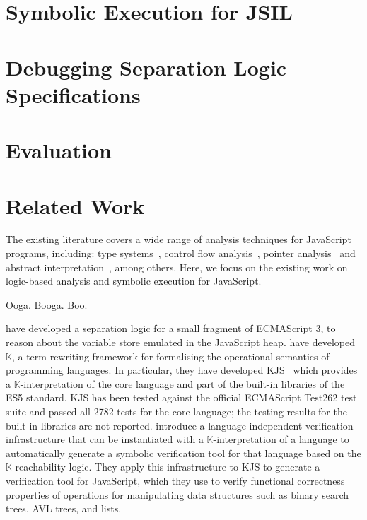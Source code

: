\documentclass[acmsmall,review,anonymous]{acmart}\settopmatter{printfolios=true,printccs=false,printacmref=false}
\newcommand{\jsil}{JSIL\xspace}
\newcommand{\myparagraph}[1]{\smallskip\noindent {\bf #1.}\hspace{1pt}}
\begin{document}
\newpage
\section{Symbolic Execution for \jsil}\label{sec:jsil:symb:exec}


\section{Debugging Separation Logic Specifications}\label{sec:specs}
%

\newpage
\section{Evaluation}\label{sec:evaluation}
%

\newpage
\section{Related Work} 

The existing literature covers a wide range of analysis techniques for JavaScript programs, including: 
type systems~\cite{thiemann:esop:2005,anderson:ecoop:2005,jensen:sas:2009,typescript:toot:2014,feldthaus:oopsla:2014,bierman:ecoop:2014,rastogi:popl:2015},
control flow analysis~\cite{feldthaus2013efficient}, pointer analysis~\cite{jang2009points,sridharan:ecoop:12} and abstract
interpretation~\cite{kashyap:fse:14,jensen:sas:2009,andreasen:oopsla:2014,park:ecoop:15}, among others. 
Here, we focus on the existing work on logic-based analysis and symbolic execution for JavaScript. 

\myparagraph{Symbolic Execution} Ooga. Booga. Boo.




\myparagraph{Logic-based Analysis} 
%
\cite{gardner:popl:2012} have developed a separation logic for a small fragment of ECMAScript 3, to reason about the variable store emulated in the JavaScript heap.
%
\cite{rosu-serbanuta-2010-jlap} have developed $\mathbb{K}$, a term-rewriting framework  for  formalising the operational
semantics of programming languages.
 In particular, they have developed KJS~\cite{Park:2015} which provides a $\mathbb{K}$-interpretation of the core language and part of the built-in libraries of the ES5 standard. KJS has been tested against the official ECMAScript Test262 test suite and passed all 2782 tests for the core language; the testing results for the built-in libraries are not reported. 
\cite{stefanescu-park-yuwen-li-rosu-2016-oopsla} introduce a language-independent verification infrastructure 
that can be instantiated with a $\mathbb{K}$-interpretation of a  language to automatically generate a symbolic verification tool for that language based on the $\mathbb{K}$ reachability logic. They apply this infrastructure to KJS to generate a verification tool for JavaScript, which they use to verify functional correctness properties of operations for manipulating data structures such as binary search trees, AVL trees, and lists.
\end{document}
